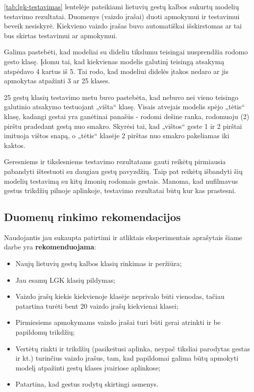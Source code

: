 \documentclass{VUMIFPSbakalaurinis}
\begin{document}
\ref{tab:lgk-testavimas} lentelėje pateikiami lietuvių gestų kalbos sukurtų modelių testavimo rezultatai. Duomenys (vaizdo įrašai) duoti apmokymui ir testavimui beveik nesiskyrė. Kiekvieno vaizdo įrašas buvo automatiškai išskirstomas ar tai bus skirtas testavimui ar apmokymui. 

Galima pastebėti, kad modeliai su dideliu tikslumu teisingai nusprendžia rodomo gesto klasę. Įdomu tai, kad kiekvienas modelis galutinį teisingą atsakymą atspėdavo 4 kartus iš 5. Tai rodo, kad modeliui didelės įtakos nedaro ar jis apmokytas atpažinti 3 ar 25 klases. 

25 gestų klasių testavimo metu buvo pastebėta, kad nebuvo nei vieno teisingo galutinio atsakymo testuojant „višta“ klasę. Visais atvejais modelis spėjo „tėtis“ klasę, kadangi gestai yra ganėtinai panašūs - rodomi dešine ranka, rodomuoju (2) pirštu pradedant gestą nuo smakro. Skyrėsi tai, kad „vištos“ geste 1 ir 2 pirštai imituoja vištos snapą, o „tėtis“ klasėje 2 pirštas nuo smakro pakeliamas iki kaktos. 

Geresniems ir tikslesniems testavimo rezultatams gauti reikėtų pirmiausia pabandyti ištestuoti su daugiau gestų pavyzdžių. Taip pat reikėtų išbandyti šių modelių testavimą su kitų žmonių rodomais gestais. Manoma, kad nufilmavus gestus trikdžių pilnoje aplinkoje, testavimo rezultatai būtų kur kas prastesni. 

\subsection{Duomenų rinkimo rekomendacijos}

Naudojantis jau sukaupta patirtimi ir atliktais eksperimentais aprašytais šiame darbe yra \textbf{rekomenduojama}:

\begin{itemize}
	\item Naujų lietuvių gestų kalbos klasių rinkimas ir peržiūra;
	\item Jau esamų LGK klasių pildymas;
	\item Vaizdo įrašų kiekis kiekvienoje klasėje neprivalo būti vienodas, tačiau patartina turėti bent 20 vaizdo įrašų kiekvienai klasei;
	\item Pirmiesiems apmokymams vaizdo įrašai turi būti gerai atrinkti ir be papildomų trikdžių;
	\item Vertėtų rinkti ir trikdžių (pasikeitusi aplinka, neypač tiksliai parodytas gestas ir kt.) turinčius vaizdo įrašus, tam, kad papildomai galima būtų apmokyti modelį atpažinti gestų klases įvairiose aplinkose;
	\item Patartina, kad gestus rodytų skirtingi asmenys.
\end{itemize}
\end{document}
